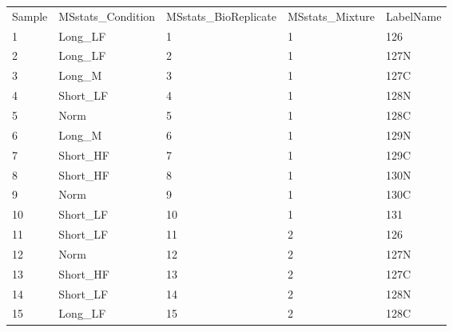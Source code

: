 \begin{table}[!ht]
\centering
\small
\begin{tabular*}{0.95\textwidth}{lllll}
Sample                                    & MSstats\_Condition & MSstats\_BioReplicate & MSstats\_Mixture & LabelName \\
1                                         & Long\_LF           & 1                     & 1                & 126       \\
2                                         & Long\_LF           & 2                     & 1                & 127N      \\
3                                         & Long\_M            & 3                     & 1                & 127C      \\
4                                         & Short\_LF          & 4                     & 1                & 128N      \\
5                                         & Norm               & 5                     & 1                & 128C      \\
6                                         & Long\_M            & 6                     & 1                & 129N      \\
7                                         & Short\_HF          & 7                     & 1                & 129C      \\
8                                         & Short\_HF          & 8                     & 1                & 130N      \\
9                                         & Norm               & 9                     & 1                & 130C      \\
10                                        & Short\_LF          & 10                    & 1                & 131       \\
11                                        & Short\_LF          & 11                    & 2                & 126       \\
12                                        & Norm               & 12                    & 2                & 127N      \\
13                                        & Short\_HF          & 13                    & 2                & 127C      \\
14                                        & Short\_LF          & 14                    & 2                & 128N      \\
15                                        & Long\_LF           & 15                    & 2                & 128C      \\

\end{tabular*}
\end{table}
